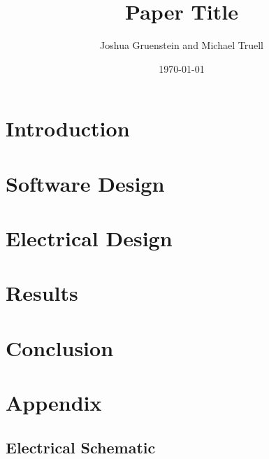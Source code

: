 \documentclass[a4paper,12pt]{article}
\title{Paper Title}
\author{Joshua Gruenstein and Michael Truell}
\date{\today}
\begin{document}
\maketitle



\section{Introduction}



\section{Software Design}



\section{Electrical Design}



\section{Results}



\section{Conclusion}



\pagebreak
\section{Appendix}

\subsection{Electrical Schematic}



\pagebreak

\end{document}
